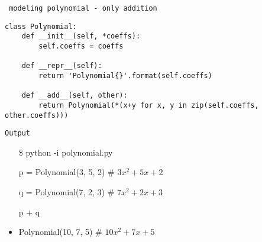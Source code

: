 \begin{center}
\texttt{ modeling polynomial - only addition}
\end{center}
\begin{verbatim}
class Polynomial:
	def __init__(self, *coeffs):
		self.coeffs = coeffs

	def __repr__(self):
		return 'Polynomial{}'.format(self.coeffs)

	def __add__(self, other):
		return Polynomial(*(x+y for x, y in zip(self.coeffs, other.coeffs)))
\end{verbatim}
\begin{center}
\texttt{Output}
\end{center}
\begin{itemize}
\item[\$] python -i polynomial.py
\item[\>] p = Polynomial(3, 5, 2) \# $3x^2 + 5x + 2$
\item[\>] q = Polynomial(7, 2, 3) \# $7x^2 + 2x + 3$
\item[\>] p + q
\item Polynomial(10, 7, 5) \# $10x^2 + 7x + 5$
\end{itemize}
